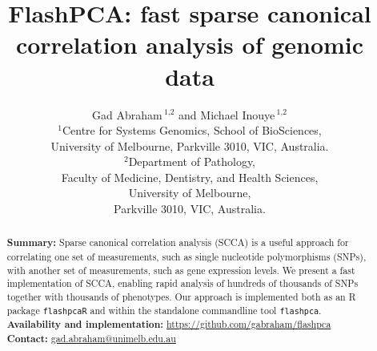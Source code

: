 \documentclass[a4paper,10pt]{article}
\title{FlashPCA: fast sparse canonical correlation analysis of genomic data}
\author{Gad Abraham\,$^{\text{1,2}}$
and Michael Inouye\,$^{\text{1,2}}$\\
$^{\text{1}}$Centre for Systems Genomics, School of
BioSciences,\\
University of Melbourne, Parkville 3010, VIC, Australia. \\
$^{\text{2}}$Department of Pathology,
\\Faculty of Medicine, Dentistry, and
Health Sciences,\\University of Melbourne,\\ Parkville 3010, VIC, Australia.}
\renewcommand{\href}[2]{\url{#1}}
\begin{document}
\maketitle

\begin{abstract}
\noindent
\textbf{Summary:} Sparse canonical correlation analysis (SCCA) is a
useful approach for correlating one set of measurements, such as single
nucleotide polymorphisms (SNPs), with another set of measurements, such as gene
expression levels.  We present a fast implementation of SCCA, enabling rapid
analysis of hundreds of thousands of SNPs together with thousands of phenotypes.
Our approach is implemented both as an R package \texttt{flashpcaR} and within
the standalone commandline tool \texttt{flashpca}.\\
\textbf{Availability and implementation:}
\href{https://github.com/gabraham/flashpca}{https://github.com/gabraham/flashpca}
\\ \textbf{Contact:}
\href{gad.abraham@unimelb.edu.au}{gad.abraham@unimelb.edu.au}
\end{abstract}







\end{document}
